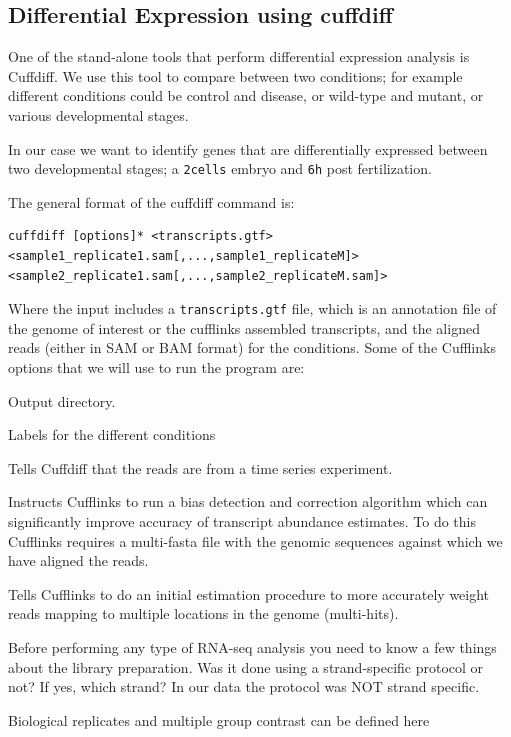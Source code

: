 \begin{bonus}
\section{Differential Expression using cuffdiff}

One of the stand-alone tools that perform differential expression analysis is
Cuffdiff. We use this tool to compare between two conditions; for example
different conditions could be control and disease, or wild-type and mutant, or
various developmental stages.

In our case we want to identify genes that are differentially expressed between
two developmental stages; a \texttt{2cells} embryo and \texttt{6h} post
fertilization.

\begin{information}
The general format of the cuffdiff command is:

\begin{lstlisting}[style=command_syntax]
cuffdiff [options]* <transcripts.gtf> <sample1_replicate1.sam[,...,sample1_replicateM]> <sample2_replicate1.sam[,...,sample2_replicateM.sam]>
\end{lstlisting}

Where the input includes a \texttt{transcripts.gtf} file, which is an annotation
file of the genome of interest or the cufflinks assembled transcripts, and the aligned reads (either in SAM or BAM
format) for the conditions.
Some of the Cufflinks options that we will use to run the program are:

\begin{description}[style=multiline,labelindent=0cm,align=right,leftmargin=\descriptionlabelspace,rightmargin=1.5cm,font=\ttfamily]
  \item[-o] Output directory.
  \item[-L] Labels for the different conditions
  \item[-T] Tells Cuffdiff that the reads are from a time series experiment.
  \item[-b] Instructs Cufflinks to run a bias detection and correction algorithm
  which can significantly improve accuracy of transcript abundance estimates.
  To do this Cufflinks requires a multi-fasta file with the genomic sequences
  against which we have aligned the reads.
  \item[-u] Tells Cufflinks to do an initial estimation procedure to more
  accurately weight reads mapping to multiple locations in the genome
  (multi-hits). 
  \item[--library-type] Before performing any type of RNA-seq analysis you need
 to know a few things about the library preparation. Was it done using a
 strand-specific protocol or not? If yes, which strand? In our data the protocol
 was NOT strand specific.
  \item[-C] Biological replicates and multiple group contrast can be defined here 
\end{description}
\end{information}


\end{bonus}
